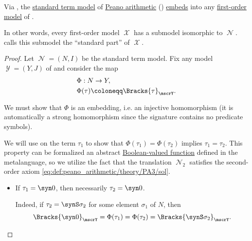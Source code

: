 \begin{proposition}\label{thm:peano_arithmetic_standard_segment}
  Via , the \hyperref[def:peano_arithmetic_term_model]{standard term model} of \hyperref[def:peano_arithmetic]{Peano arithmetic} () \hyperref[def:fol_embedding]{embeds} into any \hyperref[def:fol_semantics/model]{first-order model} of .
\end{proposition}
\begin{comments}
  \item In other words, every first-order model \( \mscrX \) has a submodel isomorphic to \( \mscrN \). \Textcite[164]{Hinman2005Logic} calls this submodel the \enquote{standard part} of \( \mscrX \).
\end{comments}
\begin{proof}
  Let \( \mscrN = (N, I) \) be the standard term model. Fix any model \( \mscrY = (Y, J) \) of  and consider the map
  \begin{equation*}
    \begin{aligned}
      &\Phi: N \to Y, \\
      &\Phi(\tau) \coloneqq \Bracks{\tau}_\mscrY.
    \end{aligned}
  \end{equation*}

  We must show that \( \Phi \) is an embedding, i.e. an injective homomorphism (it is automatically a strong homomorphism since the signature contains no predicate symbols).

   We will use  on the term \( \tau_1 \) to show that \( \Phi(\tau_1) = \Phi(\tau_2) \) implies \( \tau_1 = \tau_2 \). This property can be formalized an abstract \hyperref[def:boolean_function]{Boolean-valued function} defined in the metalanguage, so we utilize the fact that the translation \( \mscrN_2 \) satisfies the second-order axiom \eqref{eq:def:peano_arithmetic/theory/PA3/sol}.

  \begin{itemize}
    \item If \( \tau_1 = \syn0 \), then necessarily \( \tau_2 = \syn0 \).

    Indeed, if \( \tau_2 = \synS \sigma_2 \) for some element \( \sigma_1 \) of \( N \), then
    \begin{equation*}
      \Bracks{\syn0}_\mscrY = \Phi(\tau_1) = \Phi(\tau_2) = \Bracks{\synS \sigma_2}_\mscrY.
    \end{equation*}


\end{itemize}
\end{proof}
